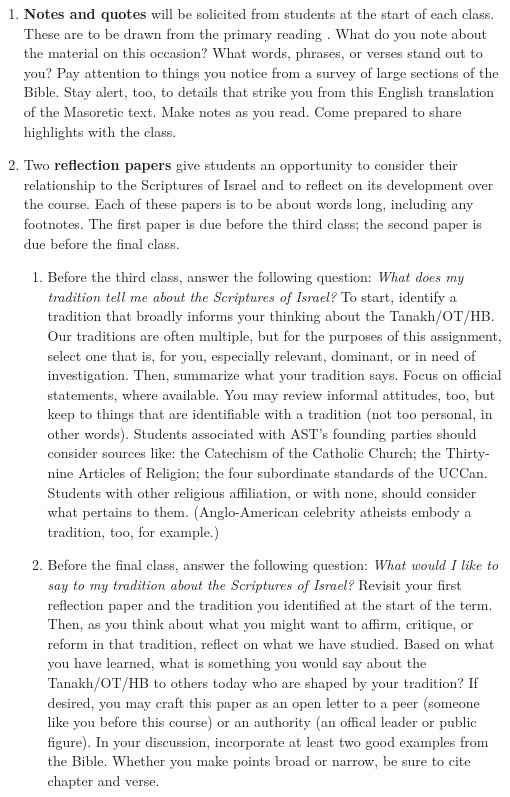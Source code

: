 \documentclass[titlepage]{article}
\begin{document}
\begin{enumerate}

	\item \textbf{Notes and quotes} will be solicited from students at
	the start of each class. These are to be drawn from the primary
	reading \cite{njps}. What do you note about the material on this
	occasion? What words, phrases, or verses stand out to you? Pay
	attention to things you notice from a survey of large sections of
	the Bible. Stay alert, too, to details that strike you from this
	English translation of the Masoretic text. Make notes as you read.
	Come prepared to share highlights with the class.
	
	\item Two \textbf{reflection papers} give students an opportunity to
	consider their relationship to the Scriptures of Israel and to
	reflect on its development over the course. Each of these papers is
	to be about  words long, including any footnotes. The
	first paper is due before the third class; the second paper is due
	before the final class.
	
	\begin{enumerate}

		\item Before the third class, answer the following question:
		\emph{What does my tradition tell me about the Scriptures of
		Israel?} To start, identify a tradition that broadly informs
		your thinking about the Tanakh/OT/HB. Our traditions are often
		multiple, but for the purposes of this assignment, select one
		that is, for you, especially relevant, dominant, or in need of
		investigation. Then, summarize what your tradition says. Focus
		on official statements, where available. You may review informal
		attitudes, too, but keep to things that are identifiable with a
		tradition (not too personal, in other words). Students
		associated with AST's founding parties should consider sources
		like: the Catechism of the Catholic Church; the Thirty-nine
		Articles of Religion; the four subordinate standards of the
		UCCan. Students with other religious affiliation, or with none,
		should consider what pertains to them. (Anglo-American celebrity
		atheists embody a tradition, too, for example.)

		\item Before the final class, answer the following question:
		\emph{What would I like to say to my tradition about the
		Scriptures of Israel?} Revisit your first reflection paper and
		the tradition you identified at the start of the term. Then, as
		you think about what you might want to affirm, critique, or
		reform in that tradition, reflect on what we have studied. Based
		on what you have learned, what is something you would say about
		the Tanakh/OT/HB to others today who are shaped by your
		tradition? If desired, you may craft this paper as an open
		letter to a peer (someone like you before this course) or an
		authority (an offical leader or public figure). In your
		discussion, incorporate at least two good examples from the
		Bible. Whether you make points broad or narrow, be sure to cite
		chapter and verse.


\end{enumerate}
\end{enumerate}
\end{document}
